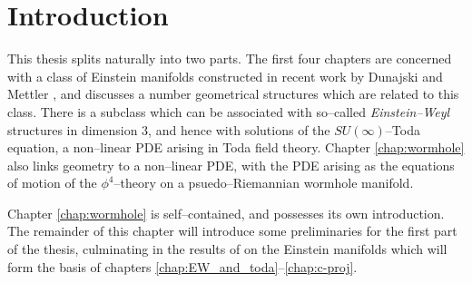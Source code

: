

\chapter{Introduction}\label{chap:intro}


This thesis splits naturally into two parts. The first four chapters are concerned with a class of Einstein manifolds constructed in recent work by Dunajski and Mettler \cite{DM}, and discusses a number geometrical structures which are related to this class. There is a subclass which can be associated with so--called \textit{Einstein--Weyl} structures in dimension $3$, and hence with solutions of the $SU(\infty)$--Toda equation, a non--linear PDE arising in Toda field theory. Chapter \ref{chap:wormhole} also links geometry to a non--linear PDE, with the PDE arising as the equations of motion of the $\phi^4$--theory on a psuedo--Riemannian wormhole manifold.

Chapter \ref{chap:wormhole} is self--contained, and possesses its own introduction. The remainder of this chapter will introduce some preliminaries for the first part of the thesis, culminating in the results of \cite{DM} on the Einstein manifolds which will form the basis of chapters \ref{chap:EW_and_toda}--\ref{chap:c-proj}. 



